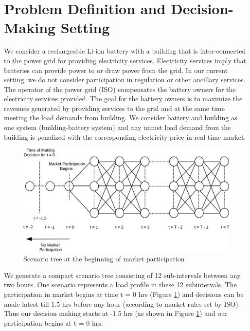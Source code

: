 \documentclass[11pt,twoside]{article}
\begin{document}
\section{Problem Definition and Decision-Making Setting}\label{sec:setting}
We consider a rechargeable Li-ion battery with a building that is inter-connected to the power grid for providing electricity services. Electricity services imply that batteries can provide power to or draw power from the grid. In our current setting, we do not consider participation in regulation or other ancillary services. The operator of the power grid (ISO) compensates the battery owners for the electricity services provided. The goal for the battery owners is to maximize the revenues generated by providing services to the grid and at the same time meeting the load demands from building. We consider battery and building as one system (building-battery system) and any unmet load demand from the building is penalized with the corresponding electricity price in real-time market.\\
\begin{figure}[h!]
\begin{center}
\includegraphics[width=5in]{Figures/scenario_tree-crop.pdf} \caption{Scenario tree at the beginning of market participation}\label{fig:scenario_tree}\end{center}
\end{figure}
We generate a compact scenario tree consisting of 12 sub-intervals between any two hours. One scenario represents a load profile in these 12 subintervals. The participation in market begins at time t = 0 hrs (Figure \ref{fig:scenario_tree}) and decisions can be made latest till 1.5 hrs before any hour (according to market rules set by ISO). Thus our decision making starts at -1.5 hrs (as shown in Figure \ref{fig:scenario_tree}) and our participation begins at t = 0 hrs.   
\end{document}

